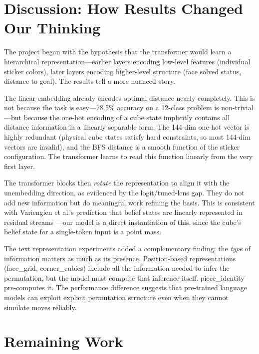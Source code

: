 \documentclass[12pt]{article}
\begin{document}
\section{Discussion: How Results Changed Our Thinking}

The project began with the hypothesis that the transformer would learn a
hierarchical representation---earlier layers encoding low-level features
(individual sticker colors), later layers encoding higher-level structure
(face solved status, distance to goal).  The results tell a more nuanced story.

The linear embedding already encodes optimal distance nearly completely.  This is
not because the task is easy---78.5\% accuracy on a 12-class problem is non-trivial
---but because the one-hot encoding of a cube state implicitly contains all
distance information in a linearly separable form.  The 144-dim one-hot vector is
highly redundant (physical cube states satisfy hard constraints, so most
144-dim vectors are invalid), and the BFS distance is a smooth function of the
sticker configuration.  The transformer learns to read this function linearly
from the very first layer.

The transformer blocks then \emph{rotate} the representation to align it with the
unembedding direction, as evidenced by the logit/tuned-lens gap.  They do not add
new information but do meaningful work refining the basis.  This is consistent with
Variengien et al.'s prediction that belief states are linearly represented in
residual streams \cite{variengien2024beliefstate}---our model is a direct
instantiation of this, since the cube's belief state for a single-token input is
a point mass.

The text representation experiments added a complementary finding: the
\emph{type} of information matters as much as its presence.  Position-based
representations (face\_grid, corner\_cubies) include all the information needed
to infer the permutation, but the model must compute that inference itself.
piece\_identity pre-computes it.  The performance difference suggests that
pre-trained language models can exploit explicit permutation structure even when
they cannot simulate moves reliably.

\section{Remaining Work}
\end{document}
